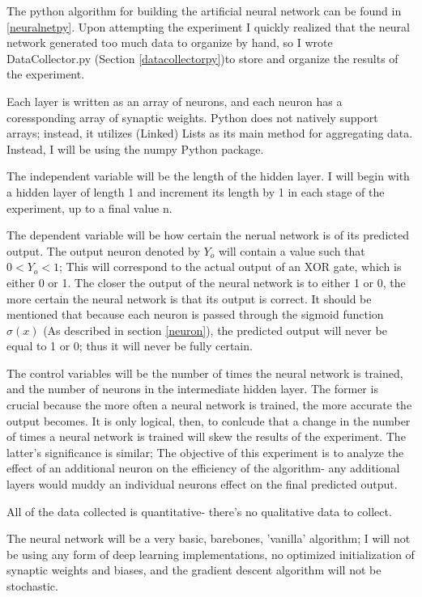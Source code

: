 \documentclass[12pt]{article}
\begin{document}
The python algorithm for building the artificial neural network can be found in \ref{neuralnetpy}. Upon attempting the experiment I quickly realized that the neural network generated too much data to organize by hand, so I wrote DataCollector.py (Section \ref{datacollectorpy})to store and organize the results of the experiment.

Each layer is written as an array of neurons, and each neuron has a coressponding array of synaptic weights. Python does not natively support arrays; instead, it utilizes (Linked) Lists as its main method for aggregating data. Instead, I will be using the numpy Python package.

The independent variable will be the length of the hidden layer. I will begin with a hidden layer of length 1 and increment its length by 1 in each stage of the experiment, up to a final value n.

The dependent variable will be how certain the nerual network is of its predicted output. The output neuron denoted by \({Y_o}\) will contain a value such that \(0 < Y_o < 1\); This will correspond to the actual output of an XOR gate, which is either 0 or 1. The closer the output of the neural network is to either 1 or 0, the more certain the neural network is that its output is correct. It should be mentioned that because each neuron is passed through the sigmoid function \(\sigma(x)\) (As described in section \ref{neuron}), the predicted output will never be equal to 1 or 0; thus it will never be fully certain.

The control variables will be the number of times the neural network is trained, and the number of neurons in the intermediate hidden layer. The former is crucial because the more often a neural network is trained, the more accurate the output becomes. It is only logical, then, to conlcude that a change in the number of times a neural network is trained will skew the results of the experiment. The latter's significance is similar; The objective of this experiment is to analyze the effect of an additional neuron on the efficiency of the algorithm- any additional layers would muddy an individual neurons effect on the final predicted output.

All of the data collected is quantitative- there's no qualitative data to collect.


The neural network will be a very basic, barebones, 'vanilla' algorithm; I will not be using any form of deep learning implementations, no optimized initialization of synaptic weights and biases, and the gradient descent algorithm will not be stochastic.
\end{document}
